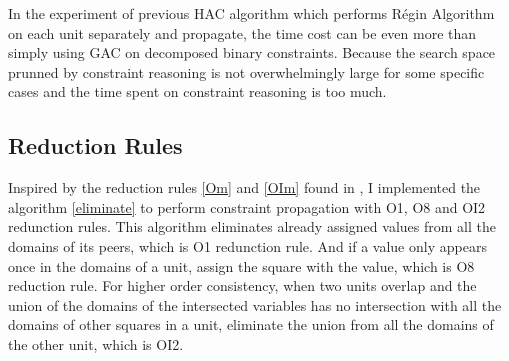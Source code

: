 \documentclass[a4paper, 12pt]{report}
\begin{document}
            In the experiment of previous HAC algorithm which performs Régin Algorithm on each unit separately and propagate, the time cost can be even more than simply using GAC on decomposed binary constraints. Because the search
            space prunned by constraint reasoning is not overwhelmingly large for some specific cases and the time spent on constraint reasoning is too much.
        \subsection{Reduction Rules}

            Inspired by the reduction rules \ref{Om} and \ref{OIm} found in \cite{lardeux2008managing,lardeux2008overlapping}, I implemented the algorithm \ref{eliminate} to perform constraint propagation with O1, O8 and OI2 redunction rules. This algorithm eliminates already assigned values from all the domains of its peers, which is O1 redunction rule. And if a value only appears once in the domains of a unit, assign the square with the value, which is O8 reduction rule. For higher order consistency, when two units overlap
            and the union of the domains of the intersected variables has no intersection with all the domains of other squares in a unit, eliminate the union from all the domains of the other unit, which is OI2.
\end{document}
